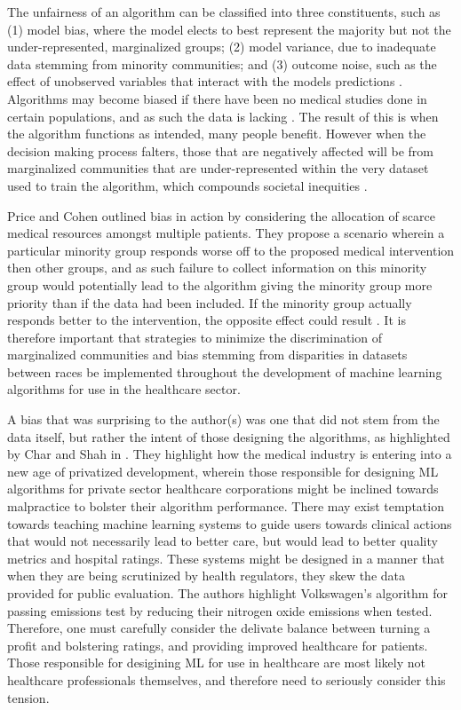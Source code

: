 \documentclass[a4paper]{article}
\begin{document}
The unfairness of an algorithm can be classified into three constituents, such as (1) model bias, where the model elects to best represent the majority but not the under-represented, marginalized groups; (2) model variance, due to inadequate data stemming from minority communities; and (3) outcome noise, such as the effect of unobserved variables that interact with the models predictions \cite{Chen_2018}. 
Algorithms may become biased if there have been no medical studies done in certain populations, and as such the data is lacking \cite{Char_2018}. The result of this is when the algorithm functions as intended, many people benefit. However when the decision making process falters, those that are negatively affected will be from marginalized communities that are under-represented within the very dataset used to train the algorithm, which compounds societal inequities \cite{Panch_2018}.

Price and Cohen outlined bias in action by considering the allocation of scarce medical resources amongst multiple patients. They propose a scenario wherein a particular minority group responds worse off to the proposed medical intervention then other groups, and as such failure to collect information on this minority group would potentially lead to the algorithm giving the minority group more priority than if the data had been included. If the minority group actually responds better to the intervention, the opposite effect could result \cite{price_privacy_2019}.
It is therefore important that strategies to minimize the discrimination of marginalized communities and bias stemming from disparities in datasets between races be implemented throughout the development of machine learning algorithms for use in the healthcare sector.

A bias that was surprising to the author(s) was one that did not stem from the data itself, but rather the intent of those designing the algorithms, as highlighted by Char and Shah in \cite{Char_2018}. They highlight how the medical industry is entering into a new age of privatized development, wherein those responsible for designing ML algorithms for private sector healthcare corporations might be inclined towards malpractice to bolster their algorithm performance. There may exist temptation towards teaching machine learning systems to guide users towards clinical actions that would not necessarily lead to better care, but would lead to better quality metrics and hospital ratings. These systems might be designed in a manner that when they are being scrutinized by health regulators, they skew the data provided for public evaluation. The authors highlight Volkswagen's algorithm for passing emissions test by reducing their nitrogen oxide emissions when tested. Therefore, one must carefully consider the delivate balance between turning a profit and bolstering ratings, and providing improved healthcare for patients. Those responsible for desigining ML for use in healthcare are most likely not healthcare professionals themselves, and therefore need to seriously consider this tension.
\end{document}
